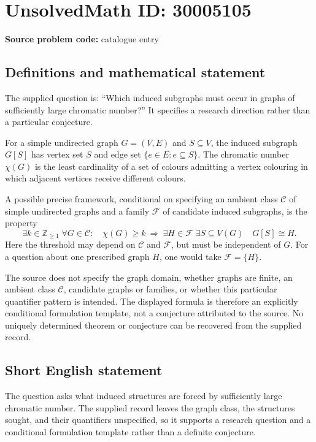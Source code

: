 \documentclass[11pt]{article}
\newcommand{\Z}{\mathbb{Z}}
\begin{document}
\section*{UnsolvedMath ID: 30005105}
\textbf{Source problem code:} catalogue entry
\subsection{Definitions and mathematical statement}
The supplied question is: ``Which induced subgraphs must occur in graphs of sufficiently large chromatic number?'' It specifies a research direction rather than a particular conjecture.

For a simple undirected graph \(G=(V,E)\) and \(S\subseteq V\), the induced subgraph \(G[S]\) has vertex set \(S\) and edge set \(\{e\in E:e\subseteq S\}\). The chromatic number \(\chi(G)\) is the least cardinality of a set of colours admitting a vertex colouring in which adjacent vertices receive different colours.

A possible precise framework, conditional on specifying an ambient class \(\mathcal C\) of simple undirected graphs and a family \(\mathcal F\) of candidate induced subgraphs, is the property
\[
\exists k\in\Z_{\geq 1}\;\forall G\in\mathcal C:\quad
\chi(G)\geq k\ \Longrightarrow\
\exists H\in\mathcal F\;\exists S\subseteq V(G)\quad G[S]\cong H.
\]
Here the threshold may depend on \(\mathcal C\) and \(\mathcal F\), but must be independent of \(G\). For a question about one prescribed graph \(H\), one would take \(\mathcal F=\{H\}\).

The source does not specify the graph domain, whether graphs are finite, an ambient class \(\mathcal C\), candidate graphs or families, or whether this particular quantifier pattern is intended. The displayed formula is therefore an explicitly conditional formulation template, not a conjecture attributed to the source. No uniquely determined theorem or conjecture can be recovered from the supplied record.
\subsection{Short English statement}
The question asks what induced structures are forced by sufficiently large chromatic number. The supplied record leaves the graph class, the structures sought, and their quantifiers unspecified, so it supports a research question and a conditional formulation template rather than a definite conjecture.
\end{document}
